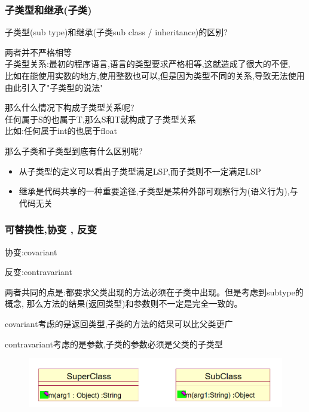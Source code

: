 \documentclass[UTF8,a4paper]{ctexart}
\begin{document}
\subsubsection{子类型和继承(子类)}

子类型(sub type)和继承(子类sub class / inheritance)的区别?

两者并不严格相等\\

子类型关系:最初的程序语言,语言的类型要求严格相等,这就造成了很大的不便,\\
比如在能使用实数的地方,使用整数也可以,但是因为类型不同的关系,导致无法使用\\
由此引入了"子类型的说法"

那么什么情况下构成子类型关系呢?\\
任何属于S的也属于T,那么S和T就构成了子类型关系\\
比如:任何属于int的也属于float

那么子类和子类型到底有什么区别呢?\\
\begin{itemize}
  \item 从子类型的定义可以看出子类型满足LSP,而子类则不一定满足LSP
  \item 继承是代码共享的一种重要途径,子类型是某种外部可观察行为(语义行为),与代码无关
\end{itemize}

\subsubsection{可替换性,协变 , 反变}
协变:covariant

反变:contravariant

两者共同的点是:都要求父类出现的方法必须在子类中出现。但是考虑到subtype的概念,
那么方法的结果(返回类型)和参数则不一定是完全一致的。

covariant考虑的是返回类型,子类的方法的结果可以比父类更广

contravariant考虑的是参数,子类的参数必须是父类的子类型

\begin{figure}[H]
  \centering
  \includegraphics[scale = 0.3]{assets/SoftwareEngineering_b54a7.png}
\end{figure}
\end{document}
